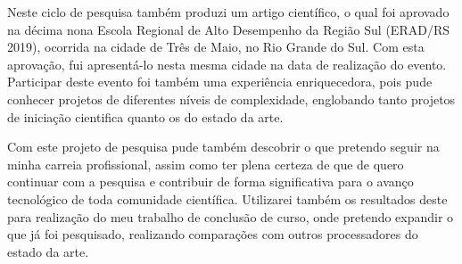 \documentclass[a4paper,11pt]{article}
\begin{document}
Neste ciclo de pesquisa também produzi um artigo científico, o qual foi aprovado na décima nona Escola Regional de Alto Desempenho da Região Sul (ERAD/RS 2019), ocorrida na cidade de Três de Maio, no Rio Grande do Sul. Com esta aprovação, fui apresentá-lo nesta mesma cidade na data de realização do evento. Participar deste evento foi também uma experiência enriquecedora, pois pude conhecer projetos de diferentes níveis de complexidade, englobando tanto projetos de iniciação cientifica quanto os do estado da arte.

Com este projeto de pesquisa pude também descobrir o que pretendo seguir na minha carreia profissional, assim como ter plena certeza de que de quero continuar com a pesquisa e contribuir de forma significativa para o avanço tecnológico de toda comunidade científica. Utilizarei também os resultados deste para realização do meu trabalho de conclusão de curso, onde pretendo expandir o que já foi pesquisado, realizando comparações com outros processadores do estado da arte.
 
 

\end{document}
